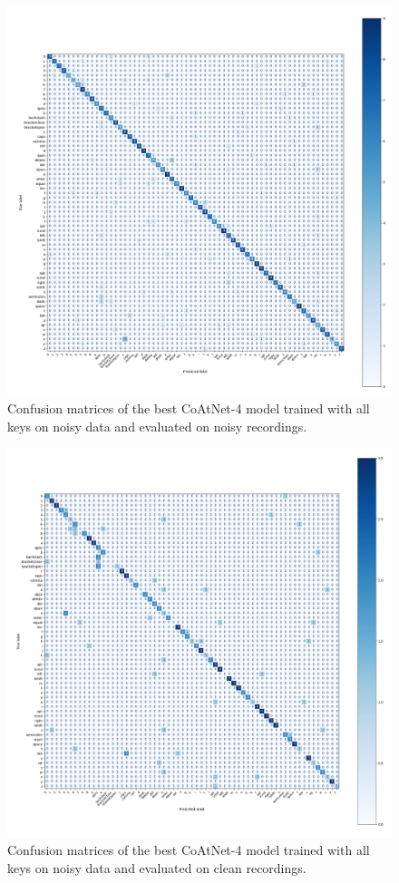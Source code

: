 \documentclass[a4paper,11pt,twoside]{report}
\theoremstyle{definition}
\begin{document}
\begin{figure}[h!]
  \centering
  \includegraphics[width=\linewidth]{img_results/cm_noisy_all_noisy.png}
  \caption{Confusion matrices of the best CoAtNet-4 model trained with all keys on noisy data and evaluated on noisy recordings.}
  \label{fig:confusion_matrices_noisy}
\end{figure}
\begin{figure}[h!]
  \centering
  \includegraphics[width=\linewidth]{img_results/cm_noisy_all_mac.png}
  \caption{Confusion matrices of the best CoAtNet-4 model trained with all keys on noisy data and evaluated on clean recordings.}
  \label{fig:confusion_matrices_noisy_mac}
\end{figure}
\end{document}
